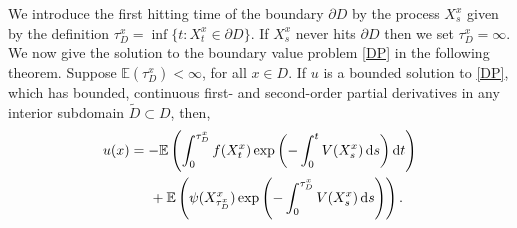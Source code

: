 \documentclass[a4paper,12pt,draft]{report}
\theoremstyle{remark}
\theoremstyle{definition}
\begin{document}
We introduce the first hitting time of the boundary $\partial D$ by the process $X_s^x$ given by the definition $\tau_D^x = \inf\{t : X_t^x \in \partial D\}$.  If $X_s^x$ never hits $\partial D$ then we set $\tau_D^x = \infty$.  We now give the solution to the boundary value problem \eqref{DP} in the following theorem.
\theorem
{
Suppose $\mathbb{E}(\tau_D^x) < \infty$, for all $x \in D$.  If $u$ is a bounded solution to \eqref{DP}, which has bounded, continuous first- and second-order partial derivatives in any interior subdomain $\tilde{D} \subset D$, then,
\begin{align}
u(x) & = -\mathbb{E}\left(\int_0^{\tau_D^x}f(X_t^x)\exp\left(-\int_0^tV(X_s^x)\,\mathrm{d}s\right)\mathrm{d}t\right)\nonumber\\
& \hspace{0.5cm} + \mathbb{E}\left(\psi(X_{\tau_D^x}^x)\exp\left(-\int_0^{\tau_D^x}V(X_s^x)\,\mathrm{d}s\right)\right). \label{DPFCF}
\end{align}
}
\proof
\end{document}
